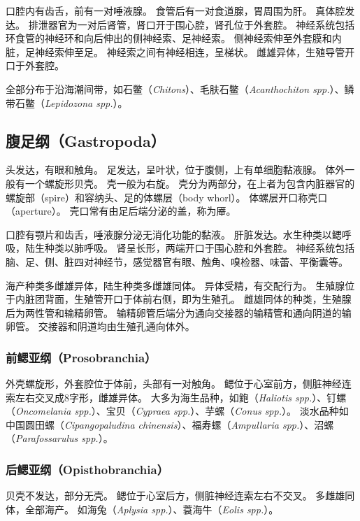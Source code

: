 \documentclass[11pt]{article}
\begin{document}
\newline
  
口腔内有齿舌，前有一对唾液腺。
食管后有一对食道腺，胃周围为肝。
真体腔发达。
排泄器官为一对后肾管，肾口开于围心腔，肾孔位于外套腔。
神经系统包括环食管的神经环和向后伸出的侧神经索、足神经索。
侧神经索伸至外套膜和内脏，足神经索伸至足。
神经索之间有神经相连，呈梯状。
雌雄异体，生殖导管开口于外套腔。
  
\newline

全部分布于沿海潮间带，如石鳖（\textit{Chitons}）、毛肤石鳖（\textit{Acanthochiton spp.}）、鳞带石鳖（\textit{Lepidozona spp.}）。

\subsection{腹足纲（Gastropoda）}
头发达，有眼和触角。
足发达，呈叶状，位于腹侧，上有单细胞黏液腺。
体外一般有一个螺旋形贝壳。
壳一般为右旋。
壳分为两部分，在上者为包含内脏器官的螺旋部（spire）和容纳头、足的体螺层（body whorl）。
体螺层开口称壳口（aperture）。
壳口常有由足后端分泌的盖，称为厣。

\newline

口腔有颚片和齿舌，唾液腺分泌无消化功能的黏液。
肝脏发达。水生种类以鳃呼吸，陆生种类以肺呼吸。
肾呈长形，两端开口于围心腔和外套腔。
神经系统包括脑、足、侧、脏四对神经节，感觉器官有眼、触角、嗅检器、味蕾、平衡囊等。

\newline

海产种类多雌雄异体，陆生种类多雌雄同体。
异体受精，有交配行为。
生殖腺位于内脏团背面，生殖管开口于体前右侧，即为生殖孔。
雌雄同体的种类，生殖腺后为两性管和输精卵管。
输精卵管后端分为通向交接器的输精管和通向阴道的输卵管。
交接器和阴道均由生殖孔通向体外。
  
\subsubsection{前鳃亚纲（Prosobranchia）}
外壳螺旋形，外套腔位于体前，头部有一对触角。
鳃位于心室前方，侧脏神经连索左右交叉成8字形，雌雄异体。
大多为海生品种，如鲍（\textit{Haliotis spp.}）、钉螺（\textit{Oncomelania spp.}）、宝贝（\textit{Cypraea spp.}）、芋螺（\textit{Conus spp.}）。
淡水品种如中国圆田螺（\textit{Cipangopaludina chinensis}）、福寿螺（\textit{Ampullaria spp.}）、沼螺（\textit{Parafossarulus spp.}）。

\subsubsection{后鳃亚纲（Opisthobranchia）}
贝壳不发达，部分无壳。
鳃位于心室后方，侧脏神经连索左右不交叉。
多雌雄同体，全部海产。
如海兔（\textit{Aplysia spp.}）、蓑海牛（\textit{Eolis spp.}）。
\end{document}
